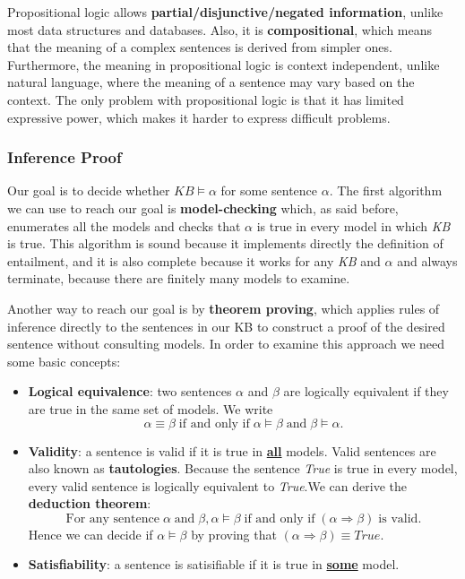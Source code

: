 \documentclass{article}
\begin{document}
Propositional logic allows \textbf{partial/disjunctive/negated information}, unlike most data structures and databases. Also, it is \textbf{compositional}, which means that the meaning of a complex sentences is derived from simpler ones. Furthermore, the meaning in propositional logic is context independent, unlike natural language, where the meaning of a sentence may vary based on the context. The only problem with propositional logic is that it has limited expressive power, which makes it harder to express difficult problems.

\subsubsection{Inference Proof}
Our goal is to decide whether \(KB \models \alpha\) for some sentence \(\alpha\). The first algorithm we can use to reach our goal is \textbf{model-checking} which, as said before, enumerates all the models and checks that \(\alpha\) is true in every model in which \textit{KB} is true. This algorithm is sound because it implements directly the definition of entailment, and it is also complete because it works for any \textit{KB} and \(\alpha\) and always terminate, because there are finitely many models to examine.

Another way to reach our goal is by \textbf{theorem proving}, which applies rules of inference directly to the sentences in our KB to construct a proof of the desired sentence without consulting models. In order to examine this approach we need some basic concepts:
\begin{itemize}
    \item \textbf{Logical equivalence}: two sentences \(\alpha\) and \(\beta\) are logically equivalent if they are true in the same set of models. We write 
        \[\alpha\equiv\beta \;\text{if and only if}\; \alpha\models\beta \;\text{and}\; \beta\models\alpha.\]
    
    \item \textbf{Validity}: a sentence is valid if it is true in \underline{\textbf{all}} models. Valid sentences are also known as \textbf{tautologies}. Because the sentence \textit{True} is true in every model, every valid sentence is logically equivalent to \textit{True}.We can derive the \textbf{deduction theorem}:
    \[\text{For any sentence}\; \alpha \;\text{and}\; \beta, \alpha\models\beta \;\text{if and only if}\; (\alpha\Rightarrow\beta) \;\text{is valid}.\]
    Hence we can decide if \(\alpha\models\beta\) by proving that \((\alpha\Rightarrow\beta)\equiv True\).
    
    \item \textbf{Satisfiability}: a sentence is satisifiable if it is true in \underline{\textbf{some}} model.
\end{itemize}
\end{document}
